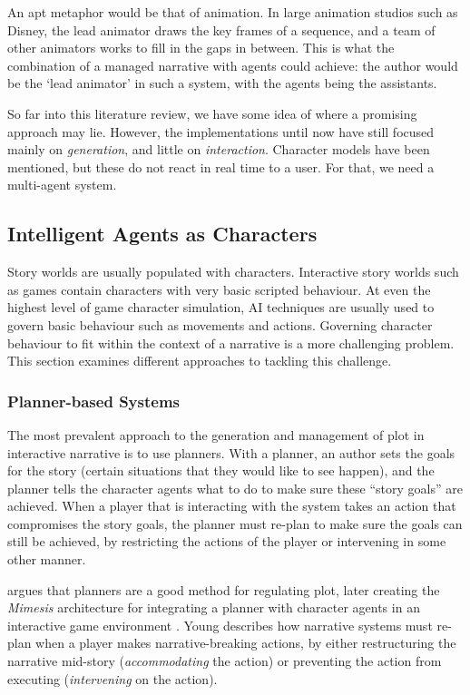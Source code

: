 An apt metaphor would be that of animation. In large animation studios such as Disney, the lead animator draws the key frames of a sequence, and a team of other animators works to fill in the gaps in between. This is what the combination of a managed narrative with agents could achieve: the author would be the `lead animator' in such a system, with the agents being the assistants.

So far into this literature review, we have some idea of where a promising approach may lie. However, the implementations until now have still focused mainly on \emph{generation\/}, and little on \emph{interaction\/}. Character models have been mentioned, but these do not react in real time to a user. For that, we need a multi-agent system.

\subsection{Intelligent Agents as Characters}
Story worlds are usually populated with characters. Interactive story worlds
such as games contain characters with very basic scripted behaviour. At even the
highest level of game character simulation, AI techniques are usually used to
govern basic behaviour such as movements and actions. Governing character
behaviour to fit within the context of a narrative is a more challenging
problem. This section examines different approaches to tackling this challenge.

\subsubsection{Planner-based Systems}
The most prevalent approach to the generation and management of plot in
interactive narrative is to use planners. With a planner, an author sets the
goals for the story (certain situations that they would like to see happen), and
the planner tells the character agents what to do to make sure these ``story
goals'' are achieved. When a player that is interacting with the system takes an
action that compromises the story goals, the planner must re-plan to make sure
the goals can still be achieved, by restricting the actions of the player or
intervening in some other manner.

\citep{young1999notes} argues that planners are a good method for regulating
plot, later creating the \emph{Mimesis} architecture for integrating a planner with character agents in an interactive game environment \cite{young2004architecture}. Young describes how narrative systems must re-plan when a player makes  narrative-breaking actions, by either restructuring the narrative mid-story (\emph{accommodating} the action) or preventing the action from executing (\emph{intervening} on the action).

